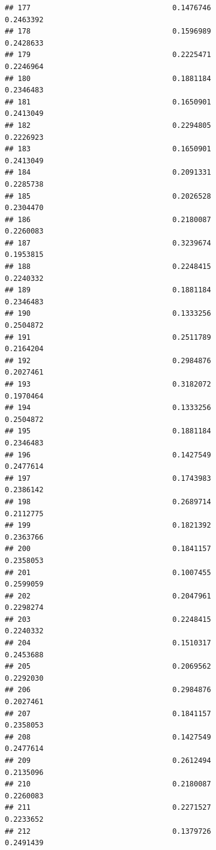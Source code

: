 \documentclass[
  american,
  man,floatsintext]{apa7}
\begin{document}
\begin{verbatim}
## 177                                 0.1476746               0.2463392
## 178                                 0.1596989               0.2428633
## 179                                 0.2225471               0.2246964
## 180                                 0.1881184               0.2346483
## 181                                 0.1650901               0.2413049
## 182                                 0.2294805               0.2226923
## 183                                 0.1650901               0.2413049
## 184                                 0.2091331               0.2285738
## 185                                 0.2026528               0.2304470
## 186                                 0.2180087               0.2260083
## 187                                 0.3239674               0.1953815
## 188                                 0.2248415               0.2240332
## 189                                 0.1881184               0.2346483
## 190                                 0.1333256               0.2504872
## 191                                 0.2511789               0.2164204
## 192                                 0.2984876               0.2027461
## 193                                 0.3182072               0.1970464
## 194                                 0.1333256               0.2504872
## 195                                 0.1881184               0.2346483
## 196                                 0.1427549               0.2477614
## 197                                 0.1743983               0.2386142
## 198                                 0.2689714               0.2112775
## 199                                 0.1821392               0.2363766
## 200                                 0.1841157               0.2358053
## 201                                 0.1007455               0.2599059
## 202                                 0.2047961               0.2298274
## 203                                 0.2248415               0.2240332
## 204                                 0.1510317               0.2453688
## 205                                 0.2069562               0.2292030
## 206                                 0.2984876               0.2027461
## 207                                 0.1841157               0.2358053
## 208                                 0.1427549               0.2477614
## 209                                 0.2612494               0.2135096
## 210                                 0.2180087               0.2260083
## 211                                 0.2271527               0.2233652
## 212                                 0.1379726               0.2491439

\end{verbatim}
\end{document}
